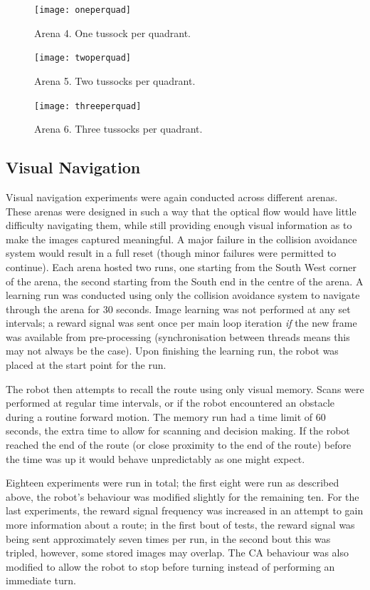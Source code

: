 \documentclass[a4paper,11pt,twoside,openright]{article}
\begin{document}
\begin{figure}[h]
  \centering
  \texttt{[image: oneperquad]}
  \caption{
    \label{fig:oneper} Arena 4. One tussock per quadrant.
  }
\end{figure}
\begin{figure}[h]
  \centering
  \texttt{[image: twoperquad]}
  \caption{
    \label{fig:twoper} Arena 5. Two tussocks per quadrant.
  }
\end{figure}
\begin{figure}[h]
  \centering
  \texttt{[image: threeperquad]}
  \caption{
    \label{fig:threeper} Arena 6. Three tussocks per quadrant.
  }
\end{figure}

\subsection{Visual Navigation}
Visual navigation experiments were again conducted across different arenas. These arenas were designed in such a way that the optical
flow would have little difficulty navigating them, while still providing enough visual information as to make the images captured
meaningful. A major failure in the collision avoidance system would result in a full reset (though minor failures were permitted to
continue). Each arena hosted two runs, one starting from the South West corner of the arena, the second starting from the South end
in the centre of the arena. A learning run was conducted using only the collision avoidance system to navigate through the arena
for 30 seconds. Image learning was not performed at any set intervals; a reward signal was sent once per main loop iteration \textit{if}
the new frame was available from pre-processing (synchronisation between threads means this may not always be the case). Upon finishing
the learning run, the robot was placed at the start point for the run.
\newline

The robot then attempts to recall the route using only visual memory. Scans were performed at regular time intervals, or if the robot
encountered an obstacle during a routine forward motion. The memory run had a time limit of 60 seconds, the extra time to allow for
scanning and decision making. If the robot reached the end of the route (or close proximity to the end of the route) before the time
was up it would behave unpredictably as one might expect.
\newline

Eighteen experiments were run in total; the first eight were run as described above, the robot's behaviour was modified slightly
for the remaining ten. For the last experiments, the reward signal frequency was increased in an attempt to gain more information
about a route; in the first bout of tests, the reward signal was being sent approximately seven times per run, in the second bout
this was tripled, however, some stored images may overlap. The CA behaviour was also modified to allow the robot to stop before
turning instead of performing an immediate turn.
\newline
\end{document}

